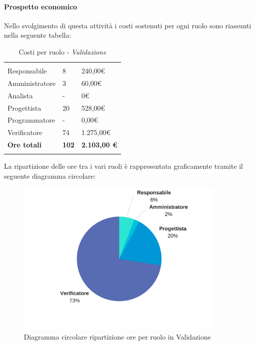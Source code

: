 			\paragraph{Prospetto economico}	\Spazio
			Nello svolgimento di questa attività i costi sostenuti per ogni ruolo sono riassunti nella seguente tabella:
			\begin{table}[H]
				\centering
				\begin{tabular}{|p{4cm}|C{4cm}|C{4cm}|}
					
					 & &\\
					Responsabile & 8 & 240,00\euro \\
					\hline
					Amministratore& 3 & 60,00\euro \\
					\hline
					Analista & - & 0\euro \\
					\hline
					Progettista & 20 & 528,00\euro \\
					\hline
					Programmatore & - & 0,00\euro \\
					\hline
					Verificatore & 74 & 1.275,00\euro \\
					\hline
					\textbf{Ore totali} & \textbf{102} & \textbf{2.103,00 \euro} \\
				\end{tabular}
				\caption{Costi per ruolo - \textit{Validazione}}
			\end{table}
			
			La ripartizione delle ore tra i vari ruoli è rappresentata graficamente tramite il seguente diagramma circolare:
			\begin{figure}[H] 
				\centering 
				\includegraphics[width=0.9\textwidth]{images/CircolareValidazione.png} 
				\caption{Diagramma circolare ripartizione ore per ruolo in Validazione}
				\label{CircolareValidazione}
			\end{figure}
			
